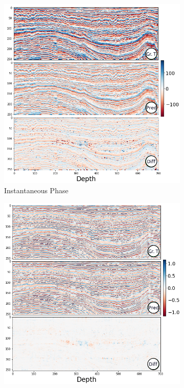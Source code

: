 \documentclass[conference]{IEEEtran}
\begin{document}
\begin{figure}[!t]
     \begin{subfigure}[b]{\figattwidth\textwidth}
         \centering
        \includegraphics[width=1.03\columnwidth]{Fig/newFigs/instantaneous-phase-half.png}
        \caption{Instantaneous Phase}
        \label{fig:instantaneous-phase}
     \end{subfigure}
     \begin{subfigure}[b]{\figattwidth\textwidth}
         \centering
        \includegraphics[width=1.0\columnwidth]{Fig/newFigs/relative-amplitude-change-half.png}

\end{subfigure}
\end{figure}
\end{document}

